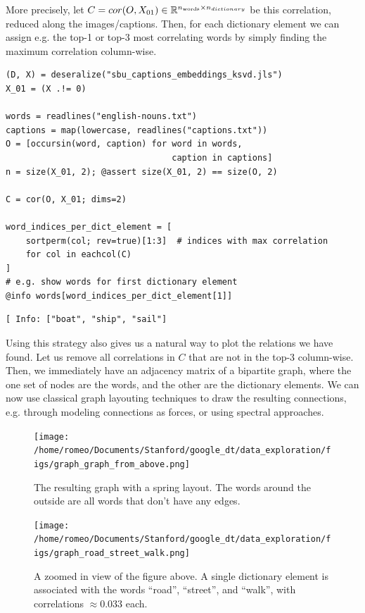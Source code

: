 \documentclass[11pt]{article}
\begin{document}
More precisely, let \(C = {cor}(O, X_{01}) \in \mathbb{R}^{n_{\rm words} \times n_{dictionary}}\) be this correlation, reduced along the images/captions.
Then, for each dictionary element we can assign e.g. the top-1 or top-3 most correlating words by simply finding the maximum correlation column-wise.

\begin{verbatim}
(D, X) = deseralize("sbu_captions_embeddings_ksvd.jls")
X_01 = (X .!= 0)

words = readlines("english-nouns.txt")
captions = map(lowercase, readlines("captions.txt"))
O = [occursin(word, caption) for word in words,
                                 caption in captions]
n = size(X_01, 2); @assert size(X_01, 2) == size(O, 2)

C = cor(O, X_01; dims=2)

word_indices_per_dict_element = [
    sortperm(col; rev=true)[1:3]  # indices with max correlation
    for col in eachcol(C)
]
# e.g. show words for first dictionary element
@info words[word_indices_per_dict_element[1]]
\end{verbatim}
\begin{verbatim}
[ Info: ["boat", "ship", "sail"]
\end{verbatim}


Using this strategy also gives us a natural way to plot the relations we have found.
Let us remove all correlations in \(C\) that are not in the top-3 column-wise.
Then, we immediately have an adjacency matrix of a bipartite graph, where the one set of nodes are the words, and the other are the dictionary elements.
We can now use classical graph layouting techniques to draw the resulting connections, e.g. through modeling connections as forces, or using spectral approaches.

\begin{figure}[htbp]
\centering
\texttt{[image: /home/romeo/Documents/Stanford/google\_dt/data\_exploration/figs/graph\_graph\_from\_above.png]}
\caption{\label{fig:graph_from_above}The resulting graph with a spring layout. The words around the outside are all words that don't have any edges.}
\end{figure}
\begin{figure}[htbp]
\centering
\texttt{[image: /home/romeo/Documents/Stanford/google\_dt/data\_exploration/figs/graph\_road\_street\_walk.png]}
\caption{\label{fig:graph_road_street_walk}A zoomed in view of the figure above. A single dictionary element is associated with the words ``road'', ``street'', and ``walk'', with correlations \(\approx0.033\) each.}
\end{figure}
\end{document}
